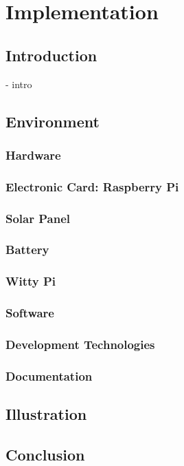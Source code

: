 

\chapter{Implementation}

\ifpdf
    \graphicspath{{Chapter3/Figs/Raster/}{Chapter3/Figs/PDF/}{Chapter3/Figs/}}
\else
    \graphicspath{{Chapter3/Figs/Vector/}{Chapter3/Figs/}}
\fi


\section{Introduction}
- intro

\section{Environment}
    \subsection{Hardware}
        \subsection{Electronic Card: Raspberry Pi}
        \subsection{Solar Panel}
        \subsection{Battery}
        \subsection{Witty Pi}
    \subsection{Software}
        \subsection{Development Technologies}
        \subsection{Documentation}

\section{Illustration}

\section{Conclusion}

